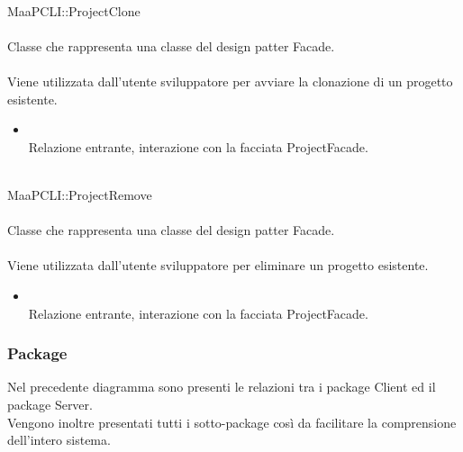 \\
MaaPCLI::ProjectClone\\
\\
Classe che rappresenta una classe del design patter Facade.\\
\\
Viene utilizzata dall'utente sviluppatore per avviare la clonazione di un progetto esistente.\\
\begin{itemize}
\item{}\\
Relazione entrante, interazione con la facciata ProjectFacade.
\end{itemize}

\\
MaaPCLI::ProjectRemove\\
\\
Classe che rappresenta una classe del design patter Facade.\\
\\
Viene utilizzata dall'utente sviluppatore per eliminare un progetto esistente.\\
\begin{itemize}
\item{}\\
Relazione entrante, interazione con la facciata ProjectFacade.
\end{itemize}

\subsubsection{Package}
Nel precedente diagramma sono presenti le relazioni tra i package Client ed il package Server.\\
Vengono inoltre presentati tutti i sotto-package così da facilitare la comprensione dell'intero sistema.

